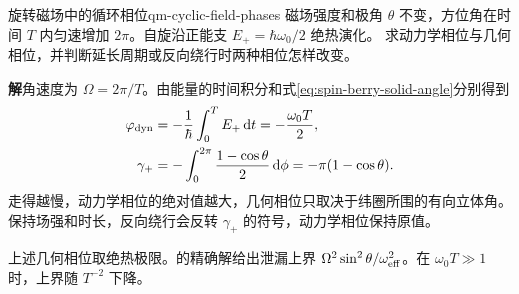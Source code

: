 \begin{example}{旋转磁场中的循环相位}{qm-cyclic-field-phases}
    磁场强度和极角 $\theta$ 不变，方位角在时间 $T$ 内匀速增加 $2\pi$。自旋沿正能支 $E_+ = \hbar\omega_0/2$ 绝热演化。
    求动力学相位与几何相位，并判断延长周期或反向绕行时两种相位怎样改变。

    \par\smallskip\textbf{解}\quad 角速度为 $\Omega = 2\pi/T$。由能量的时间积分和式\eqref{eq:spin-berry-solid-angle}分别得到
    \begin{equation}
        \begin{alignedat}{1}
            \varphi_{\mathrm{dyn}} &= -\frac1\hbar\int_0^T E_+\mathop{}\!\mathrm{d} t = -\frac{\omega_0T}{2},\\
            \gamma_+ &= -\int_0^{2\pi}\frac{1 - \cos\theta}{2}\mathop{}\!\mathrm{d}\phi = -\pi(1 - \cos\theta).
        \end{alignedat}
    \end{equation}
    走得越慢，动力学相位的绝对值越大，几何相位只取决于纬圈所围的有向立体角。
    保持场强和时长，反向绕行会反转 $\gamma_+$ 的符号，动力学相位保持原值。

    上述几何相位取绝热极限。的精确解给出泄漏上界
    $\Omega^2\sin^2\theta/\omega_{\mathrm{eff}}^2$。在 $\omega_0 T \gg 1$ 时，上界随 $T^{-2}$ 下降。
\end{example}

